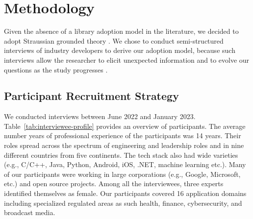 \section{Methodology}\label{sec:methodology}
Given the absence of a library adoption model in the literature, we decided to adopt Straussian grounded theory \cite{corbin2014gt}.  
We chose to conduct semi-structured interviews of industry developers to derive our adoption model, because such interviews allow the researcher to elicit unexpected information and to evolve our questions as the study progresses \cite{HoveAnda,Seaman}. 







\subsection{Participant Recruitment Strategy}
We conducted \numInterviews interviews between June 2022 and January 2023. Table~\ref{tab:interviewee-profile} provides an overview of participants.
The average number years of professional experience of the participants was 14 years. Their roles spread across the spectrum of engineering and leadership roles and in nine different countries from five continents. The tech stack also had wide varieties (e.g., C/C++, Java, Python, Android, iOS, .NET, machine learning etc.). Many of our participants were working in large corporations (e.g., Google, Microsoft, etc.) and open source projects. Among all the interviewees, three experts identified themselves as female. Our participants covered 16 application domains including specialized regulated areas as such health, finance, cybersecurity, and broadcast media. 

